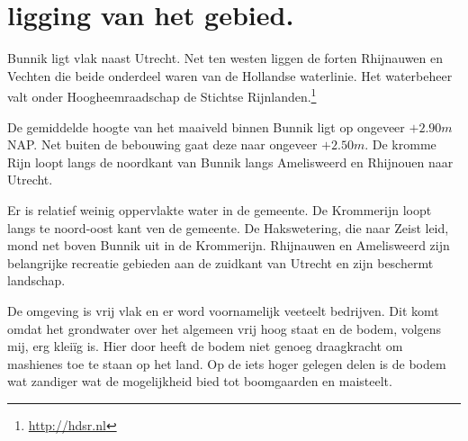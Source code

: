 \section{ligging van het gebied.}
Bunnik ligt vlak naast Utrecht.
Net ten westen liggen de forten Rhijnauwen en Vechten die beide onderdeel waren van de Hollandse waterlinie.
Het waterbeheer valt onder Hoogheemraadschap de Stichtse Rijnlanden.\footnote{\url{http://hdsr.nl}}

De gemiddelde hoogte van het maaiveld binnen Bunnik ligt op ongeveer $+2.90 m$ NAP.
Net buiten de bebouwing gaat deze naar ongeveer $+2.50 m$.
De kromme Rijn loopt langs de noordkant van Bunnik langs Amelisweerd en Rhijnouen naar Utrecht.

Er is relatief weinig oppervlakte water in de gemeente.
De Krommerijn loopt langs te noord-oost kant ven de gemeente.
De Hakswetering, die naar Zeist leid, mond net boven Bunnik uit in de Krommerijn.
Rhijnauwen en Amelisweerd zijn belangrijke recreatie gebieden aan de zuidkant van Utrecht 
en zijn beschermt landschap.

De omgeving is vrij vlak en er word voornamelijk veeteelt bedrijven.
Dit komt omdat het grondwater over het algemeen vrij hoog staat en de bodem, volgens mij, erg klei\"ig is.
Hier door heeft de bodem niet genoeg draagkracht om mashienes toe te staan op het land.
Op de iets hoger gelegen delen is de bodem wat zandiger wat de mogelijkheid bied tot boomgaarden en maisteelt.




